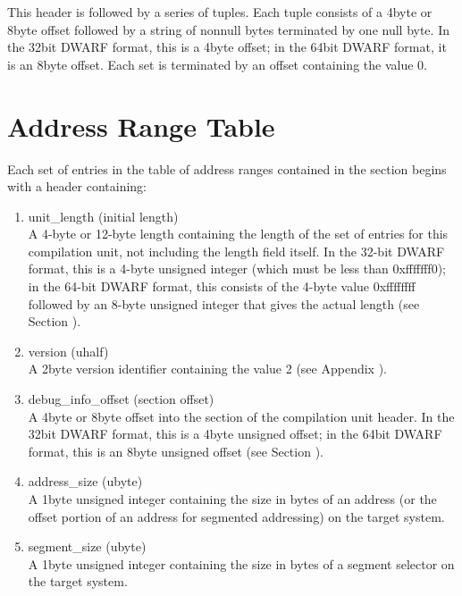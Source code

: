 This header is followed by a series of tuples. Each tuple
consists of a 4\dash byte or 8\dash byte offset followed by a string
of non\dash null bytes terminated by one null byte. 
In the 32\dash bit
DWARF format, this is a 4\dash byte offset; in the 64\dash bit DWARF
format, it is an 8\dash byte offset. 
Each set is terminated by an
offset containing the value 0.


\section{Address Range Table}
\label{datarep:addrssrangetable}

Each set of entries in the table of address ranges contained
in the 
section begins with a header containing:

\begin{enumerate}[1.]

\item unit\_length (initial length) \\
A 4-byte or 12-byte length containing the length of the
set of entries for this compilation unit, not including the
length field itself. In the 32-bit DWARF format, this is a
4-byte unsigned integer (which must be less than 0xfffffff0);
in the 64-bit DWARF format, this consists of the 4-byte value
0xffffffff followed by an 8-byte unsigned integer that gives
the actual length 
(see Section ).

\item version (uhalf) \\
A 2\dash byte version identifier
 containing the value 2 
(see Appendix ). 

\item debug\_info\_offset (section offset) \\
A 4\dash byte or 8\dash byte offset into the 
 section of
the compilation unit header. In the 32\dash bit DWARF format,
this is a 4\dash byte unsigned offset; in the 64\dash bit DWARF format,
this is an 8\dash byte unsigned offset 
(see Section ).

\item address\_size (ubyte) \\
A 1\dash byte unsigned integer containing the size in bytes of an
address (or the offset portion of an address for segmented
addressing) on the target system.

\item segment\_size (ubyte) \\
A 1\dash byte unsigned integer containing the size in bytes of a
segment selector on the target system.

\end{enumerate}

